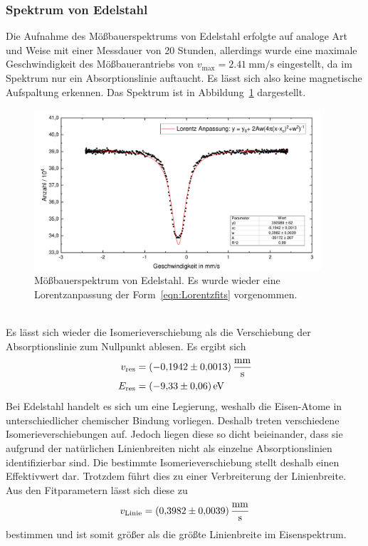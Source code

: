 \documentclass[a4paper,twoside,final]{article}
\begin{document}
\subsubsection{Spektrum von Edelstahl}
Die Aufnahme des Mößbauerspektrums von Edelstahl erfolgte auf analoge Art und Weise mit einer Messdauer von 20 Stunden, allerdings wurde eine maximale Geschwindigkeit des Mößbauerantriebs von $v_\text{max} = \SI{2,41}{\milli\metre\per\second}$ eingestellt, da im Spektrum nur ein Absorptionslinie auftaucht. Es lässt sich also keine magnetische Aufspaltung erkennen. Das Spektrum ist in Abbildung~\ref{fig:Edelstahl_Spektrum} dargestellt.
\begin{figure}[htp]
    \centering
    \includegraphics[width=0.95\textwidth]{Bilder/Moessbauer_Edelstahl_Lorentz.pdf}
    \caption{Mößbauerspektrum von Edelstahl. Es wurde wieder eine Lorentzanpassung der Form~\eqref{eqn:Lorentzfits} vorgenommen.}
    \label{fig:Edelstahl_Spektrum}
\end{figure}\\
Es lässt sich wieder die Isomerieverschiebung als die Verschiebung der Absorptionslinie zum Nullpunkt ablesen. Es ergibt sich
\begin{align}
  v_\text{res} &= \SI[per-mode=fraction, separate-uncertainty]{-0,1942\pm 0,0013}{\milli\metre\per\second}\\
  E_\text{res} &= \SI[separate-uncertainty]{-9,33
\pm 0,06}{\electronvolt}
\end{align}
Bei Edelstahl handelt es sich um eine Legierung, weshalb die Eisen-Atome in unterschiedlicher chemischer Bindung vorliegen. Deshalb treten verschiedene Isomerieverschiebungen auf. Jedoch liegen diese so dicht beieinander, dass sie aufgrund der natürlichen Linienbreiten nicht als einzelne Absorptionslinien identifizierbar sind. Die bestimmte Isomerieverschiebung stellt deshalb einen Effektivwert dar. Trotzdem führt dies zu einer Verbreiterung der Linienbreite. Aus den Fitparametern lässt sich diese zu
\begin{align}
  v_\text{Linie} = \SI[per-mode=fraction, separate-uncertainty]{0,3982 \pm 0,0039}{\milli\metre\per\second}
\end{align}
bestimmen und ist somit größer als die größte Linienbreite im Eisenspektrum.
\end{document}
